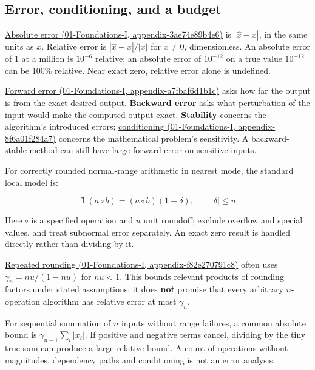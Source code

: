 \subsection{Error, conditioning, and a budget}\label{05-engine-i-ch001-error-conditioning-and-a-budget}

\href{../01-Foundations-I/main.pdf\#nameddest=appendix-3ae74e89b4e6}{Absolute error (01-Foundations-I, appendix-3ae74e89b4e6)} is \(|\widehat x-x|\), in the same units as \(x\). Relative error is \(|\widehat x-x|/|x|\) for \(x\ne0\), dimensionless. An absolute error of 1 at a million is \(10^{-6}\) relative; an absolute error of \(10^{-12}\) on a true value \(10^{-12}\) can be 100\% relative. Near exact zero, relative error alone is undefined.

\href{../01-Foundations-I/main.pdf\#nameddest=appendix-a7fbaf6d1b1c}{Forward error (01-Foundations-I, appendix-a7fbaf6d1b1c)} asks how far the output is from the exact desired output. \textbf{Backward error} asks what perturbation of the input would make the computed output exact. \textbf{Stability} concerns the algorithm's introduced errors; \href{../01-Foundations-I/main.pdf\#nameddest=appendix-8f6a01f284a7}{conditioning (01-Foundations-I, appendix-8f6a01f284a7)} concerns the mathematical problem's sensitivity. A backward-stable method can still have large forward error on sensitive inputs.

For correctly rounded normal-range arithmetic in nearest mode, the standard local model is:

\[
\operatorname{fl}(a\circ b)=(a\circ b)(1+\delta),\qquad |\delta|\le u.
\]

Here \(\circ\) is a specified operation and \(u\) unit roundoff; exclude overflow and special values, and treat subnormal error separately. An exact zero result is handled directly rather than dividing by it.

\href{../01-Foundations-I/main.pdf\#nameddest=appendix-f82e270791c8}{Repeated rounding (01-Foundations-I, appendix-f82e270791c8)} often uses \(\gamma_n=nu/(1-nu)\) for \(nu<1\). This bounds relevant products of rounding factors under stated assumptions; it does \textbf{not} promise that every arbitrary \(n\)-operation algorithm has relative error at most \(\gamma_n\).

For sequential summation of \(n\) inputs without range failures, a common absolute bound is \(\gamma_{n-1}\sum_i|x_i|\). If positive and negative terms cancel, dividing by the tiny true sum can produce a large relative bound. A count of operations without magnitudes, dependency paths and conditioning is not an error analysis.

